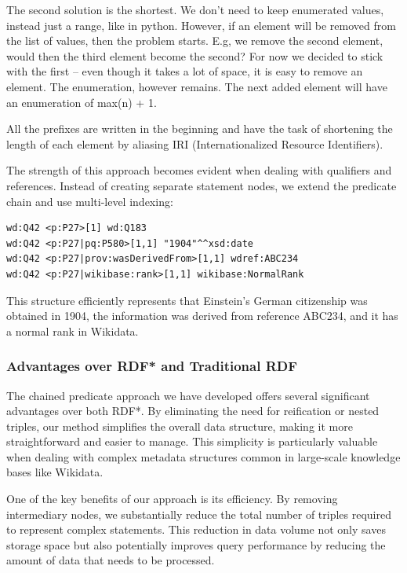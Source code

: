 The second solution is the shortest. We don't need to keep enumerated values, instead just a range, like in python. However, if an element will be removed from the list of values, then the problem starts. E.g, we remove the second element, would then the third element become the second? For now we decided to stick with the first – even though it takes a lot of space, it is easy to remove an element. The enumeration, however remains. The next added element will have an enumeration of max(n) + 1.

All the prefixes are written in the beginning and have the task of shortening the length of each element by aliasing IRI (Internationalized Resource Identifiers).


The strength of this approach becomes evident when dealing with qualifiers and references. Instead of creating separate statement nodes, we extend the predicate chain and use multi-level indexing:

{\footnotesize
\begin{verbatim}
wd:Q42 <p:P27>[1] wd:Q183
wd:Q42 <p:P27|pq:P580>[1,1] "1904"^^xsd:date
wd:Q42 <p:P27|prov:wasDerivedFrom>[1,1] wdref:ABC234
wd:Q42 <p:P27|wikibase:rank>[1,1] wikibase:NormalRank
\end{verbatim}
}

This structure efficiently represents that Einstein's German citizenship was obtained in 1904, the information was derived from reference ABC234, and it has a normal rank in Wikidata.

\subsubsection{Advantages over RDF* and Traditional RDF}

The chained predicate approach we have developed offers several significant advantages over both RDF*. By eliminating the need for reification or nested triples, our method simplifies the overall data structure, making it more straightforward and easier to manage. This simplicity is particularly valuable when dealing with complex metadata structures common in large-scale knowledge bases like Wikidata.

One of the key benefits of our approach is its efficiency. By removing intermediary nodes, we substantially reduce the total number of triples required to represent complex statements. This reduction in data volume not only saves storage space but also potentially improves query performance by reducing the amount of data that needs to be processed.

